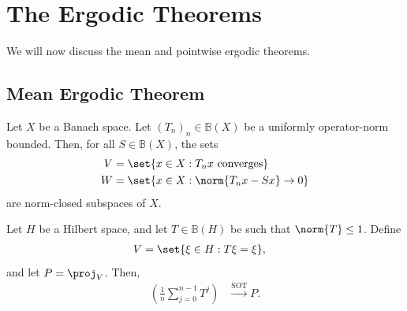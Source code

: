 \documentclass[10pt]{mypackage}
\begin{document}
\section{The Ergodic Theorems}%
We will now discuss the mean and pointwise ergodic theorems.
\subsection{Mean Ergodic Theorem}%
\begin{proposition}
  Let $X$ be a Banach space. Let $\left( T_n \right)_n\in \mathbb{B}(X)$ be a uniformly operator-norm bounded. Then, for all $S\in \mathbb{B}(X)$, the sets
  \begin{align*}
    V &= \set{x\in X : T_nx\text{ converges}}\\
    W &= \set{x\in X : \norm{T_nx - Sx}\rightarrow 0}
  \end{align*}
  are norm-closed subspaces of $X$.
\end{proposition}
\begin{theorem}
  Let $H$ be a Hilbert space, and let $T\in \mathbb{B}(H)$ be such that $\norm{T}\leq 1$. Define
  \begin{align*}
    V &= \set{\xi\in H : T\xi = \xi},
  \end{align*}
  and let $P = \proj_V$. Then, 
  \begin{align*}
    \left( \frac{1}{n}\sum_{j=0}^{n-1}T^{j} \right) &\xrightarrow{\operatorname{SOT}} P.
  \end{align*}
\end{theorem}
\end{document}
